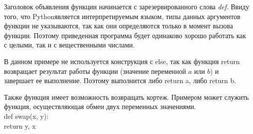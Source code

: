 \documentclass[a4paper, fleqn]{article}
\newcommand*{\py}{Python}
\begin{document}
	Заголовок объявления функции начинается с зарезервированного слова \emph{def}. Ввиду того, что \py является интерпретируемым языком, типы данных аргументов функции не указываются, так как они определяются только в момент вызова функции. Поэтому приведенная программа будет одинаково хорошо работать как с целыми, так и с вещественными числами.
	
	В данном примере не используется конструкция с else, так как функция return возвращает результат работы функции (значение переменной $a$ или $b$) и завершает ее выполнение.
	Поэтому выполнится либо return a, либо return b.
	
	Также функция имеет возможность возвращать кортеж. Примером может служить функция, осуществляющая обмен двух переменных значениями.\\ 
	def swap(x, y):\\
		return y, x\\
	

	
\end{document}

